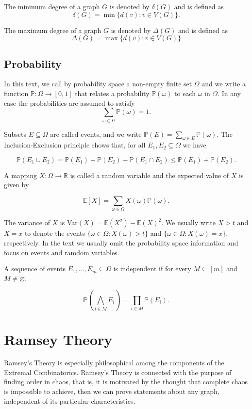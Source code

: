 \documentclass[12pt,twoside,a4paper,bibliography=totocnumbered]{book}
\numberwithin{equation}{section}
\let\emptyset=\varnothing
\theoremstyle{remark}
\begin{document}
The minimum degree of a graph $G$ is denoted by $\delta(G)$ and is defined as
$$\delta(G) = \min\{d(v) \colon v \in V (G)\}.$$

The maximum degree of a graph $G$ is denoted by $\Delta(G)$ and is defined as 
$$ \Delta(G) = \max\{d(v) \colon v \in V(G)\} $$

\section{Probability}
In this text, we call by probability space a non-empty finite set $\Omega$ and we write a function $\mathbb{P}\colon \Omega \rightarrow [0,1]$ that relates a probability $\mathbb{P}(\omega)$ to each $\omega$ in $\Omega$. In any case the probabilities are assumed to satisfy
$$ \sum_{\omega \in \Omega} \mathbb{P}(\omega) = 1.$$

Subsets $E \subseteq \Omega$ are called events, and we write $\mathbb{P}(E) = \sum_{\omega \in E}\mathbb{P}(\omega)$. The Inclusion-Exclusion principle shows that, for all $E_1, E_2 \subseteq \Omega$ we have

$$ \mathbb{P}(E_1 \cup E_2) = \mathbb{P}(E_1) + \mathbb{P}(E_2) - \mathbb{P}(E_1 \cap E_2) \leq \mathbb{P}(E_1) + \mathbb{P}(E_2).$$

A mapping $X\colon \Omega \rightarrow \mathbb{R}$ is called a random variable and the expected value of $X$ is given by

$$ \mathbb{E}[X] = \sum_{\omega \in \Omega}X(\omega)\mathbb{P}(\omega) .$$

The variance of $X$ is Var$(X) = \mathbb{E}(X^2) - \mathbb{E}(X)^2$. We usually write $X > t$ and $X = x$ to denote the events $\{\omega 
\in \Omega \colon X(\omega) > t\}$ and $\{\omega \in \Omega \colon X(\omega) = x\}$, respectively. In the text we usually omit the probability space information and focus on events and ramdom variables. 

A sequence of events $E_1,\ldots,E_m \subseteq \Omega$ is independent if for every $M \subseteq [m]$ and $M \neq \emptyset$,

$$ \mathbb{P}\left( \bigwedge_{i \in M}E_i \right) = \prod_{i \in M} \mathbb{P}(E_i).$$

\chapter{Ramsey Theory}

Ramsey's Theory is especially philosophical among the components of the Extremal Combinatorics. Ramsey's Theory is connected with the purpose of finding order in chaos, that is, it is motivated by the thought that complete chaos is impossible to achieve, then we can prove statements about any graph, independent of its particular characteristics.
\end{document}
